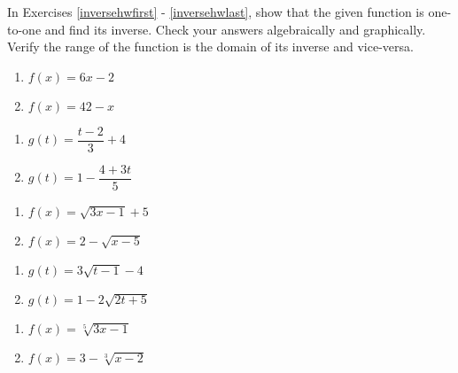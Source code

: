 In Exercises \ref{inversehwfirst} - \ref{inversehwlast}, show that the given function is one-to-one and find its inverse.  Check your answers algebraically and graphically.  Verify the range of the function is the domain of its inverse and vice-versa.

\begin{multicols}{2}
\begin{enumerate}
\setcounter{enumi}{\value{HW}}

\item $f(x) = 6x - 2$ \label{inversehwfirst}
\item $f(x) = 42-x$


\setcounter{HW}{\value{enumi}}
\end{enumerate}
\end{multicols}


\begin{multicols}{2}
\begin{enumerate}
\setcounter{enumi}{\value{HW}}

\item $g(t) = \dfrac{t-2}{3} + 4$
\item $g(t)  = 1 - \dfrac{4+3t}{5}$


\setcounter{HW}{\value{enumi}}
\end{enumerate}
\end{multicols}


\begin{multicols}{2}
\begin{enumerate}
\setcounter{enumi}{\value{HW}}

\item $f(x) = \sqrt{3x-1}+5$
\item $f(x) = 2-\sqrt{x - 5}$

\setcounter{HW}{\value{enumi}}
\end{enumerate}
\end{multicols}

\begin{multicols}{2}
\begin{enumerate}
\setcounter{enumi}{\value{HW}}

\item $g(t) = 3\sqrt{t-1}-4$
\item $g(t) = 1 - 2\sqrt{2t+5}$


\setcounter{HW}{\value{enumi}}
\end{enumerate}
\end{multicols}

\begin{multicols}{2}
\begin{enumerate}
\setcounter{enumi}{\value{HW}}

\item $f(x) = \sqrt[5]{3x-1}$
\item $f(x) = 3-\sqrt[3]{x-2}$

\setcounter{HW}{\value{enumi}}
\end{enumerate}
\end{multicols}

